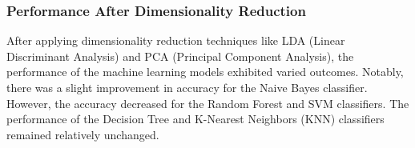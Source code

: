 \documentclass[a4paper]{article}
\theoremstyle{plain}
\theoremstyle{definition}
\begin{document}
\begin{enumerate}
\subsubsection{Performance After Dimensionality Reduction }
After applying dimensionality reduction techniques like LDA (Linear Discriminant Analysis) and PCA (Principal Component Analysis), the performance of the machine learning models exhibited varied outcomes. Notably, there was a slight improvement in accuracy for the Naive Bayes classifier. However, the accuracy decreased for the Random Forest and SVM classifiers. The performance of the Decision Tree and K-Nearest Neighbors (KNN) classifiers remained relatively unchanged.
\begin{table}[h!]
\centering
\caption{Performance metrics measures after performing PCA -}
\label{my-label}
\end{table}
\begin{table}[h!]
\centering
\caption{Performance metrics measures after performing LDA -}
\label{my-label}
\end{table}\\


\end{enumerate}
\end{document}
